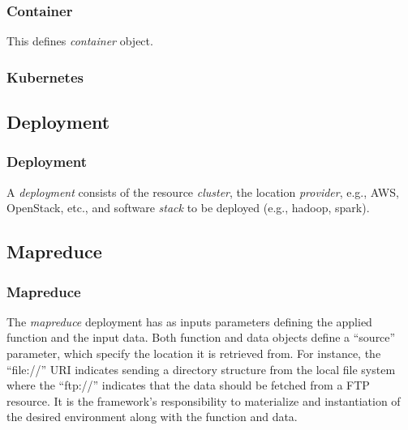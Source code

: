 \documentclass[10pt]{article}
\begin{document}
\subsubsection{Container}

This defines {\em container} object.


\subsubsection{Kubernetes}



\subsection{Deployment}

\subsubsection{Deployment}

A \textit{deployment} consists of the resource \- \textit{cluster},
the location \- \textit{provider}, e.g., AWS, OpenStack, etc., and
software \textit{stack} to be deployed (e.g., hadoop, spark).


\subsection{Mapreduce}

\subsubsection{Mapreduce}

The \textit{mapreduce} deployment has as inputs parameters defining
the applied function and the input data.  Both function and data
objects define a ``source'' parameter, which specify the location it
is retrieved from. For instance, the ``file://'' URI indicates sending
a directory structure from the local file system where the ``ftp://''
indicates that the data should be fetched from a FTP resource. It is
the framework's responsibility to materialize and instantiation of the
desired environment along with the function and data.
\end{document}
